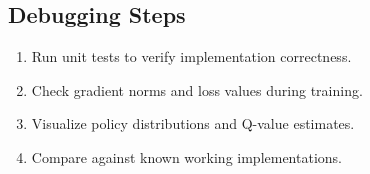 \documentclass[conference]{IEEEtran}
\begin{document}
\subsection{Debugging Steps}
\begin{enumerate}
  \item Run unit tests to verify implementation correctness.
  \item Check gradient norms and loss values during training.
  \item Visualize policy distributions and Q-value estimates.
  \item Compare against known working implementations.
\end{enumerate}
\end{document}
